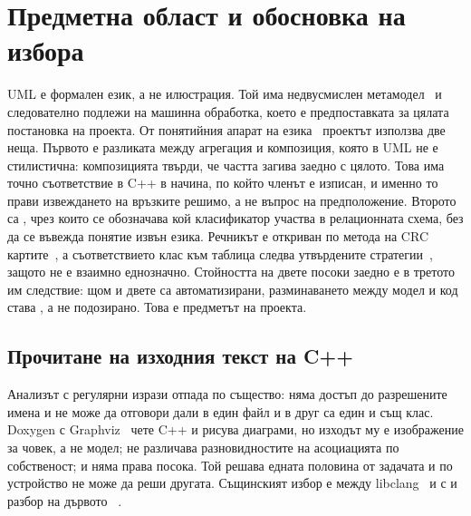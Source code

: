 \section{Предметна област и обосновка на избора}
\label{sec:literature}

UML е формален език, а не илюстрация. Той има недвусмислен метамодел~\cite{omg_uml251} и следователно
подлежи на машинна обработка, което е предпоставката за цялата постановка на проекта. От понятийния
апарат на езика~\cite{booch2005userguide} проектът използва две неща. Първото е
разликата между агрегация и композиция, която в UML не е стилистична: композицията твърди, че частта
загива заедно с цялото. Това има точно съответствие в C++ в начина, по който членът е изписан, и именно
то прави извеждането на връзките решимо, а не въпрос на предположение. Второто са , чрез които се обозначава кой класификатор участва в релационната схема, без да се въвежда
понятие извън езика. Речникът е откриван по метода на CRC картите~\cite{beck1989crc}, а съответствието
клас към таблица следва утвърдените стратегии~\cite{ambler2003agiledb}, защото не е взаимно еднозначно.
Стойността на двете посоки заедно е в третото им следствие: щом и двете са автоматизирани,
разминаването между модел и код става , а не подозирано. Това е предметът на проекта.

\subsection{Прочитане на изходния текст на C++}
\label{sec:alternatives}

Анализът с регулярни изрази отпада по същество: няма достъп до разрешените имена и не може да отговори
дали  в един файл и  в друг са един и същ клас. Doxygen с
Graphviz~\cite{doxygen_manual} чете C++ и рисува диаграми, но изходът му е изображение за човек, а не
модел; не различава разновидностите на асоциацията по собственост; и няма права посока. Той решава
едната половина от задачата и по устройство не може да реши другата. Същинският избор е между
libclang~\cite{libclang_docs} и  с  и разбор на дървото~\cite{clang_ast_json} .

